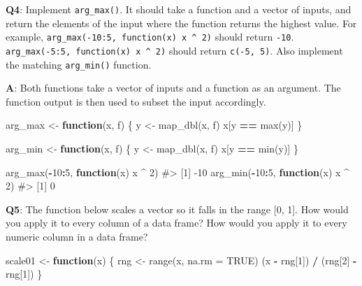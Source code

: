 \documentclass[
]{krantz}
\makeatletter
\newenvironment{Shaded}{\begin{snugshade}}{\end{snugshade}}
\newcommand{\CommentTok}[1]{\textcolor[rgb]{0.56,0.35,0.01}{\textit{#1}}}
\newcommand{\ControlFlowTok}[1]{\textcolor[rgb]{0.13,0.29,0.53}{\textbf{#1}}}
\newcommand{\DataTypeTok}[1]{\textcolor[rgb]{0.13,0.29,0.53}{#1}}
\newcommand{\DecValTok}[1]{\textcolor[rgb]{0.00,0.00,0.81}{#1}}
\newcommand{\KeywordTok}[1]{\textcolor[rgb]{0.13,0.29,0.53}{\textbf{#1}}}
\newcommand{\NormalTok}[1]{#1}
\newcommand{\OperatorTok}[1]{\textcolor[rgb]{0.81,0.36,0.00}{\textbf{#1}}}
\newcommand{\OtherTok}[1]{\textcolor[rgb]{0.56,0.35,0.01}{#1}}
\newcommand{\StringTok}[1]{\textcolor[rgb]{0.31,0.60,0.02}{#1}}
\newenvironment{kframe}{%
\medskip{}
\setlength{\fboxsep}{.8em}
 \def\at@end@of@kframe{}%
 \ifinner\ifhmode%
  \def\at@end@of@kframe{\end{minipage}}%
  \begin{minipage}{\columnwidth}%
 \fi\fi%
 \def\FrameCommand##1{\hskip\@totalleftmargin \hskip-\fboxsep
 \colorbox{shadecolor}{##1}\hskip-\fboxsep
     \hskip-\linewidth \hskip-\@totalleftmargin \hskip\columnwidth}%
 \MakeFramed {\advance\hsize-\width
   \@totalleftmargin\z@ \linewidth\hsize
   \@setminipage}}%
 {\par\unskip\endMakeFramed%
 \at@end@of@kframe}
\renewenvironment{Shaded}{\begin{kframe}}{\end{kframe}}
\renewcommand{\KeywordTok} [1]{\textcolor[rgb]{0.00,0.44,0.13}{{#1}}}
\renewcommand{\DataTypeTok}[1]{\textcolor[rgb]{0.56,0.13,0.00}{{#1}}}
\renewcommand{\DecValTok}  [1]{\textcolor[rgb]{0.25,0.63,0.44}{{#1}}}
\renewcommand{\StringTok}  [1]{\textcolor[rgb]{0.25,0.44,0.63}{{#1}}}
\renewcommand{\CommentTok} [1]{\textcolor[rgb]{0.38,0.63,0.69}{{#1}}}
\renewcommand{\OtherTok}   [1]{\textcolor[rgb]{0.00,0.44,0.13}{{#1}}}
\renewcommand{\NormalTok}  [1]{{#1}}
\makeatother
\begin{document}
\textbf{{Q4}}: Implement \texttt{arg\_max()}. It should take a function and a vector of inputs, and return the elements of the input where the function returns the highest value. For example, \texttt{arg\_max(-10:5,\ function(x)\ x\ \^{}\ 2)} should return \texttt{-10}. \texttt{arg\_max(-5:5,\ function(x)\ x\ \^{}\ 2)} should return \texttt{c(-5,\ 5)}. Also implement the matching \texttt{arg\_min()} function.

\textbf{{A}}: Both functions take a vector of inputs and a function as an argument. The function output is then used to subset the input accordingly.

\begin{Shaded}
\begin{Highlighting}[]
\NormalTok{arg_max <-}\StringTok{ }\ControlFlowTok{function}\NormalTok{(x, f) \{}
\NormalTok{  y <-}\StringTok{ }\KeywordTok{map_dbl}\NormalTok{(x, f)}
\NormalTok{  x[y }\OperatorTok{==}\StringTok{ }\KeywordTok{max}\NormalTok{(y)]}
\NormalTok{\}}

\NormalTok{arg_min <-}\StringTok{ }\ControlFlowTok{function}\NormalTok{(x, f) \{}
\NormalTok{  y <-}\StringTok{ }\KeywordTok{map_dbl}\NormalTok{(x, f)}
\NormalTok{  x[y }\OperatorTok{==}\StringTok{ }\KeywordTok{min}\NormalTok{(y)]}
\NormalTok{\}}

\KeywordTok{arg_max}\NormalTok{(}\OperatorTok{-}\DecValTok{10}\OperatorTok{:}\DecValTok{5}\NormalTok{, }\ControlFlowTok{function}\NormalTok{(x) x }\OperatorTok{^}\StringTok{ }\DecValTok{2}\NormalTok{)}
\CommentTok{#> [1] -10}
\KeywordTok{arg_min}\NormalTok{(}\OperatorTok{-}\DecValTok{10}\OperatorTok{:}\DecValTok{5}\NormalTok{, }\ControlFlowTok{function}\NormalTok{(x) x }\OperatorTok{^}\StringTok{ }\DecValTok{2}\NormalTok{)}
\CommentTok{#> [1] 0}
\end{Highlighting}
\end{Shaded}

\textbf{{Q5}}: The function below scales a vector so it falls in the range {[}0, 1{]}. How would you apply it to every column of a data frame? How would you apply it to every numeric column in a data frame?

\begin{Shaded}
\begin{Highlighting}[]
\NormalTok{scale01 <-}\StringTok{ }\ControlFlowTok{function}\NormalTok{(x) \{}
\NormalTok{  rng <-}\StringTok{ }\KeywordTok{range}\NormalTok{(x, }\DataTypeTok{na.rm =} \OtherTok{TRUE}\NormalTok{)}
\NormalTok{  (x }\OperatorTok{-}\StringTok{ }\NormalTok{rng[}\DecValTok{1}\NormalTok{]) }\OperatorTok{/}\StringTok{ }\NormalTok{(rng[}\DecValTok{2}\NormalTok{] }\OperatorTok{-}\StringTok{ }\NormalTok{rng[}\DecValTok{1}\NormalTok{])}
\NormalTok{\}}
\end{Highlighting}
\end{Shaded}
\end{document}
